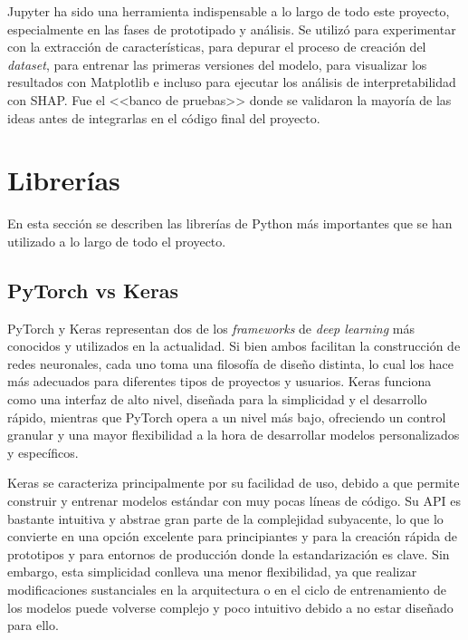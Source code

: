 Jupyter ha sido una herramienta indispensable a lo largo de todo este proyecto, especialmente en las fases de prototipado y análisis. Se utilizó para experimentar con la extracción de características, para depurar el proceso de creación del \textit{dataset}, para entrenar las primeras versiones del modelo, para visualizar los resultados con Matplotlib e incluso para ejecutar los análisis de interpretabilidad con SHAP. Fue el <<banco de pruebas>> donde se validaron la mayoría de las ideas antes de integrarlas en el código final del proyecto.

\section{Librerías}

En esta sección se describen las librerías de Python más importantes que se han utilizado a lo largo de todo el proyecto.

\subsection{PyTorch vs Keras}


PyTorch y Keras representan dos de los \textit{frameworks} de \textit{deep learning} más conocidos y utilizados en la actualidad. Si bien ambos facilitan la construcción de redes neuronales, cada uno toma una filosofía de diseño distinta, lo cual los hace más adecuados para diferentes tipos de proyectos y usuarios. Keras funciona como una interfaz de alto nivel, diseñada para la simplicidad y el desarrollo rápido, mientras que PyTorch opera a un nivel más bajo, ofreciendo un control granular y una mayor flexibilidad a la hora de desarrollar modelos personalizados y específicos.

Keras se caracteriza principalmente por su facilidad de uso, debido a que permite construir y entrenar modelos estándar con muy pocas líneas de código. Su API es bastante intuitiva y abstrae gran parte de la complejidad subyacente, lo que lo convierte en una opción excelente para principiantes y para la creación rápida de prototipos y para entornos de producción donde la estandarización es clave. Sin embargo, esta simplicidad conlleva una menor flexibilidad, ya que realizar modificaciones sustanciales en la arquitectura o en el ciclo de entrenamiento de los modelos puede volverse complejo y poco intuitivo debido a no estar diseñado para ello.

